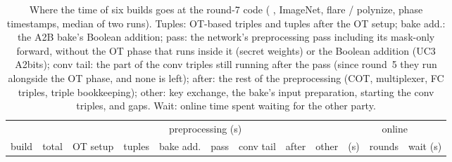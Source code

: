 \begin{table}[t]
\centering\small
\setlength{\tabcolsep}{3.5pt}
\begin{tabular}{@{}lrrrrrrrrrrr@{}}
\toprule
& & \multicolumn{7}{c}{preprocessing (s)} & \multicolumn{3}{c}{online}\\
\cmidrule(lr){2-9}\cmidrule(l){10-12}
build & total & OT setup & tuples & bake add. & pass & conv tail & after & other & (s) & rounds & wait (s)\\
\midrule

\end{tabular}
\caption{Where the time of six builds goes at the round-7 code ( , ImageNet, flare / polynize,
phase timestamps, median of two runs). Tuples: OT-based triples and tuples after the OT setup; bake add.: the A2B
bake's Boolean addition; pass: the network's preprocessing pass including its mask-only forward, without the OT phase
that runs inside it (secret weights) or the Boolean addition (UC3 A2bits); conv tail: the part of the conv triples
still running after the pass (since round~5 they run alongside the OT phase, and none is left); after: the rest of the
preprocessing (COT, multiplexer, FC triples, triple bookkeeping); other: key exchange, the bake's input preparation,
starting the conv triples, and gaps. Wait: online time spent waiting for the other party.}
\label{tab:triadphases}
\end{table}

